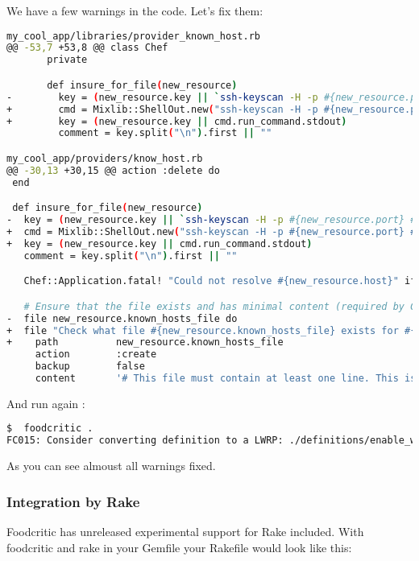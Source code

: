 We have a few warnings in the code. Let's fix them:

\begin{lstlisting}[language=Bash,label=lst:testing-foodcritic3]
my_cool_app/libraries/provider_known_host.rb
@@ -53,7 +53,8 @@ class Chef
       private

       def insure_for_file(new_resource)
-        key = (new_resource.key || `ssh-keyscan -H -p #{new_resource.port} #{new_resource.host} 2>&1`)
+        cmd = Mixlib::ShellOut.new("ssh-keyscan -H -p #{new_resource.port} #{new_resource.host} 2>&1")
+        key = (new_resource.key || cmd.run_command.stdout)
         comment = key.split("\n").first || ""

my_cool_app/providers/know_host.rb
@@ -30,13 +30,15 @@ action :delete do
 end

 def insure_for_file(new_resource)
-  key = (new_resource.key || `ssh-keyscan -H -p #{new_resource.port} #{new_resource.host} 2>&1`)
+  cmd = Mixlib::ShellOut.new("ssh-keyscan -H -p #{new_resource.port} #{new_resource.host} 2>&1")
+  key = (new_resource.key || cmd.run_command.stdout)
   comment = key.split("\n").first || ""

   Chef::Application.fatal! "Could not resolve #{new_resource.host}" if key =~ /getaddrinfo/

   # Ensure that the file exists and has minimal content (required by Chef::Util::FileEdit)
-  file new_resource.known_hosts_file do
+  file "Check what file #{new_resource.known_hosts_file} exists for #{new_resource.name}" do
+    path          new_resource.known_hosts_file
     action        :create
     backup        false
     content       '# This file must contain at least one line. This is that line.'
\end{lstlisting}

And run again :

\begin{lstlisting}[language=Bash,label=lst:testing-foodcritic4]
$  foodcritic .
FC015: Consider converting definition to a LWRP: ./definitions/enable_web_site.rb:1
\end{lstlisting}

As you can see almoust all warnings fixed.

\subsubsection{Integration by Rake}

Foodcritic has unreleased experimental support for Rake included. With foodcritic and rake in your Gemfile your Rakefile would look like this:

